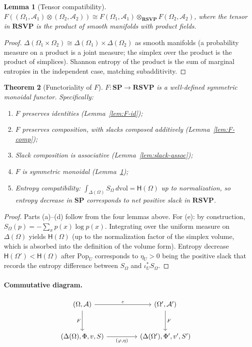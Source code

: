 \documentclass[12pt,a4paper]{article}
\newtheorem{theorem}{Theorem}[section]
\newtheorem{lemma}[theorem]{Lemma}
\theoremstyle{definition}
\theoremstyle{remark}
\newcommand{\Ent}{\ensuremath{\mathsf{H}}}
\newcommand{\SP}{\mathbf{SP}}
\newcommand{\RSVP}{\mathbf{RSVP}}
\newcommand{\Pop}{\ensuremath{\mathrm{Pop}}}
\newcommand{\tensor}{\otimes}
\newcommand{\PhiF}{\Phi}
\newcommand{\vF}{v}
\newcommand{\SF}{S}
\begin{document}
\begin{lemma}[Tensor compatibility]
\label{lem:F-tensor}
$F((\Omega_1,\mathcal{A}_1)\tensor(\Omega_2,\mathcal{A}_2))\cong
F(\Omega_1,\mathcal{A}_1)\tensor_\RSVP F(\Omega_2,\mathcal{A}_2)$,
where the tensor in $\RSVP$ is the product of smooth manifolds with product fields.
\end{lemma}

\begin{proof}
$\Delta(\Omega_1\times\Omega_2)\cong\Delta(\Omega_1)\times\Delta(\Omega_2)$ as smooth
manifolds (a probability measure on a product is a joint measure; the simplex over
the product is the product of simplices). Shannon entropy of the product is the sum
of marginal entropies in the independent case, matching subadditivity.
\end{proof}

\begin{theorem}[Functoriality of $F$]
\label{thm:functor}
$F:\SP\to\RSVP$ is a well-defined symmetric monoidal functor. Specifically:
\begin{enumerate}[label=(\alph*)]
\item $F$ preserves identities (Lemma~\ref{lem:F-id});
\item $F$ preserves composition, with slacks composed additively (Lemma~\ref{lem:F-comp});
\item Slack composition is associative (Lemma~\ref{lem:slack-assoc});
\item $F$ is symmetric monoidal (Lemma~\ref{lem:F-tensor});
\item Entropy compatibility: $\int_{\Delta(\Omega)}\SF_\Omega\,d\mathrm{vol}=\Ent(\Omega)$
  up to normalization, so entropy decrease in $\SP$ corresponds to net positive slack
  in $\RSVP$.
\end{enumerate}
\end{theorem}

\begin{proof}
Parts (a)--(d) follow from the four lemmas above. For (e): by construction,
$\SF_\Omega(p)=-\sum_x p(x)\log p(x)$. Integrating over the uniform measure on
$\Delta(\Omega)$ yields $\Ent(\Omega)$ (up to the normalization factor of the simplex
volume, which is absorbed into the definition of the volume form). Entropy decrease
$\Ent(\Omega')<\Ent(\Omega)$ after $\Pop_U$ corresponds to $\eta_U>0$ being the
positive slack that records the entropy difference between $\SF_\Omega$ and
$\iota_U^*\SF_\Omega$.
\end{proof}

\paragraph{Commutative diagram.}
\[
\begin{tikzcd}[column sep=4.5em, row sep=3em]
  (\Omega,\mathcal{A})
  \arrow[r,"e"]
  \arrow[d,"F"']
  &
  (\Omega',\mathcal{A}')
  \arrow[d,"F"]
  \\
  (\Delta(\Omega),\PhiF,\vF,\SF)
  \arrow[r,"{(\varphi,\eta)}"']
  &
  (\Delta(\Omega'),\PhiF',\vF',\SF')
\end{tikzcd}
\]
\end{document}
